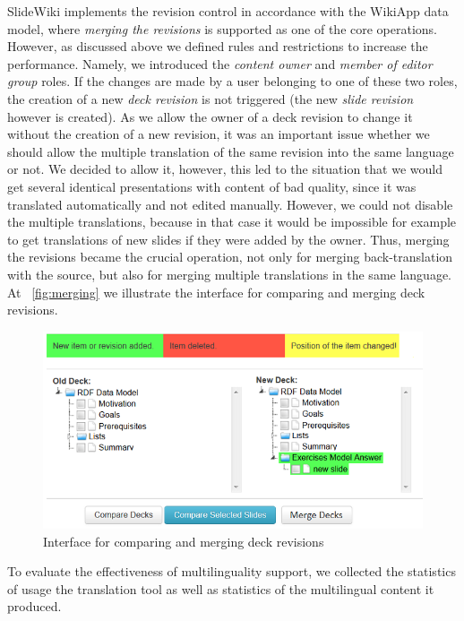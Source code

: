 \documentclass[ngerman,UKenglish,table]{scrbook}
\begin{document}
SlideWiki implements the revision control in accordance with the WikiApp data model, where \emph{merging the revisions} is supported as one of the core operations.
However, as discussed above we defined rules and restrictions to increase the performance.
Namely, we introduced the \emph{content owner} and \emph{member of editor group} roles.
If the changes are made by a user belonging to one of these two roles, the creation of a new \emph{deck revision} is not triggered (the new \emph{slide revision} however is created).
As we allow the owner of a deck revision to change it without the creation of a new revision, it was an important issue whether we should allow the multiple translation of the same revision into the same language or not.
We decided to allow it, however, this led to the situation that we would get several identical presentations with content of bad quality, since it was translated automatically and not edited manually.
However, we could not disable the multiple translations, because in that case it would be impossible for example to get translations of new slides if they were added by the owner.
Thus, merging the revisions became the crucial operation, not only for merging back-translation with the source, but also for merging multiple translations in the same language.
At ~\autoref{fig:merging} we illustrate the interface for comparing and merging deck revisions.

\begin{figure}[!htb]
	\centering
		\includegraphics{Images/merging.png}
	\caption{Interface for comparing and merging deck revisions}
	\label{fig:merging}
\end{figure}

To evaluate the effectiveness of multilinguality support, we collected the statistics of usage the translation tool as well as statistics of the multilingual content it produced.
\end{document}
